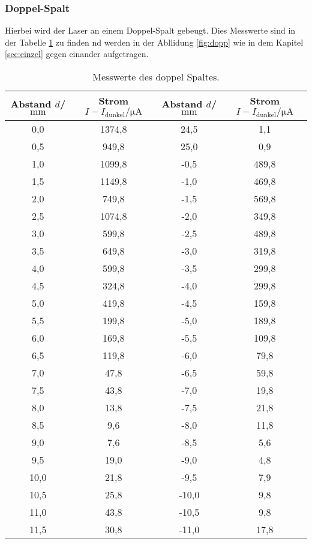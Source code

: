 \subsubsection{Doppel-Spalt}
Hierbei wird der Laser an einem Doppel-Spalt gebeugt. Dies Messwerte
sind in der Tabelle \ref{tab:dopp} zu finden
nd werden in der Abllidung \ref{fig:dopp} wie in dem Kapitel \ref{sec:einzel} gegen einander aufgetragen.
\begin{table}
  \centering
  \caption{Messwerte des doppel Spaltes.}
  \label{tab:dopp}
  \begin{tabular}{c c c c}
Abstand $d$/$\si{\milli\meter}$ & Strom $I-I_\mathrm{dunkel}/\si{\micro\ampere}$ & Abstand $d$/$\si{\milli\meter}$ & Strom $I-I_\mathrm{dunkel}/\si{\micro\ampere}$\\
    \midrule
    0,0 & 1374,8 & 24,5 & 1,1  \\
    0,5 & 949,8  & 25,0 & 0,9  \\
    1,0 & 1099,8 & -0,5 & 489,8\\
    1,5 & 1149,8 & -1,0 & 469,8\\
    2,0 & 749,8  & -1,5 & 569,8\\
    2,5 & 1074,8 & -2,0 & 349,8\\
    3,0 & 599,8  & -2,5 & 489,8\\
    3,5 & 649,8  & -3,0 & 319,8\\
    4,0 & 599,8  & -3,5 & 299,8\\
    4,5 & 324,8  & -4,0 & 299,8\\
    5,0 & 419,8  & -4,5 & 159,8\\
    5,5 & 199,8  & -5,0 & 189,8\\
    6,0 & 169,8  & -5,5 & 109,8\\
    6,5 & 119,8  & -6,0 & 79,8 \\
    7,0 & 47,8   & -6,5 & 59,8 \\
    7,5 & 43,8   & -7,0 & 19,8 \\
    8,0 & 13,8   & -7,5 & 21,8 \\
    8,5 & 9,6    & -8,0 & 11,8 \\
    9,0 & 7,6    & -8,5 & 5,6  \\
    9,5 & 19,0   & -9,0 & 4,8  \\
    10,0 & 21,8  & -9,5 & 7,9  \\
    10,5 & 25,8  & -10,0 & 9,8 \\
    11,0 & 43,8  & -10,5 & 9,8 \\
    11,5 & 30,8  & -11,0 & 17,8 \\

\end{tabular}
\end{table}
